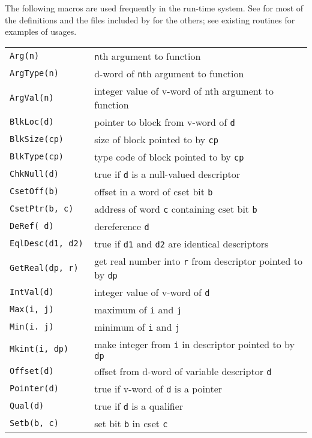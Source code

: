 The following macros are used frequently in the run-time system.  See
 for most of the definitions and the files included by
 for the others; see existing routines for examples of
usages.\\[0.5cm]
{\renewcommand{\arraystretch}{0.9}%
\begin{xtabular}{>{\hspace{1cm}\texttt\bgroup}l<{\egroup}@{\hspace{1cm}}p{11cm}}
Arg(n)            & \texttt{n}th argument to function\\
ArgType(n)        & d-word of \texttt{n}th argument to function\\
ArgVal(n)         & integer value of v-word of nth argument to function\\
BlkLoc(d)         & pointer to block from v-word of \texttt{d}\\
BlkSize(cp)       & size of block pointed to by \texttt{cp}\\
BlkType(cp)       & type code of block pointed to by \texttt{cp}\\
ChkNull(d)        & true if \texttt{d} is a null-valued descriptor\\
CsetOff(b)        & offset in a word of cset bit \texttt{b}\\
CsetPtr(b, c)     & address of word \texttt{c} containing cset bit \texttt{b}\\
DeRef( d)         & dereference \texttt{d}\\
EqlDesc(d1, d2)   & true if \texttt{d1} and \texttt{d2} are identical descriptors\\
GetReal(dp, r)    & get real number into \texttt{r} from
                    descriptor pointed to by \texttt{dp}\\
IntVal(d)         & integer value of v-word of \texttt{d}\\
Max(i, j)         & maximum of \texttt{i} and \texttt{j}\\
Min(i. j)         & minimum of \texttt{i} and \texttt{j}\\
Mkint(i, dp)      & make integer from \texttt{i} in descriptor
                    pointed to by \texttt{dp}\\
Offset(d)         & offset from d-word of variable descriptor \texttt{d}\\
Pointer(d)        & true if v-word of \texttt{d} is a pointer\\
Qual(d)           & true if \texttt{d} is a qualifier\\
Setb(b, c)        & set bit \texttt{b} in cset \texttt{c}\\

\end{xtabular}}
